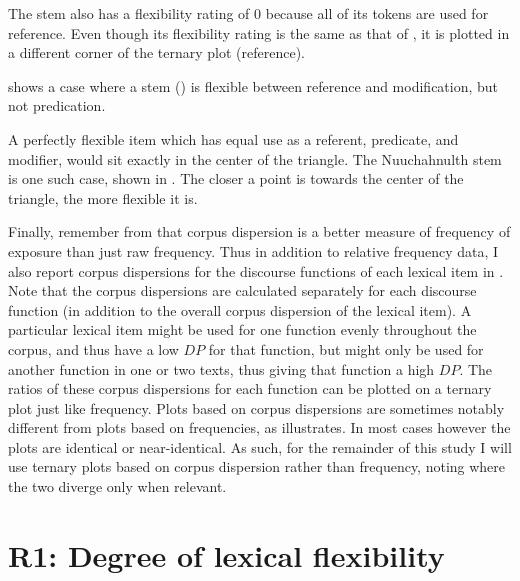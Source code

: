 
\noindent The stem  also has a flexibility rating of $0$ because all of its tokens are used for reference. Even though its flexibility rating is the same as that of , it is plotted in a different corner of the ternary plot (reference).

 shows a case where a stem () is flexible between reference and modification, but not predication.


\noindent A perfectly flexible item which has equal use as a referent, predicate, and modifier, would sit exactly in the center of the triangle. The Nuuchahnulth stem   is one such case, shown in . The closer a point is towards the center of the triangle, the more flexible it is.


Finally, remember from  that corpus dispersion is a better measure of frequency of exposure than just raw frequency. Thus in addition to relative frequency data, I also report corpus dispersions for the discourse functions of each lexical item in . Note that the corpus dispersions are calculated separately for each discourse function (in addition to the overall corpus dispersion of the lexical item). A particular lexical item might be used for one function evenly throughout the corpus, and thus have a low $DP$ for that function, but might only be used for another function in one or two texts, thus giving that function a high $DP$. The ratios of these corpus dispersions for each function can be plotted on a ternary plot just like frequency. Plots based on corpus dispersions are sometimes notably different from plots based on frequencies, as  illustrates. In most cases however the plots are identical or near-identical. As such, for the remainder of this study I will use ternary plots based on corpus dispersion rather than frequency, noting where the two diverge only when relevant.


\section{R1: Degree of lexical flexibility}
\label{sec:4.3}

